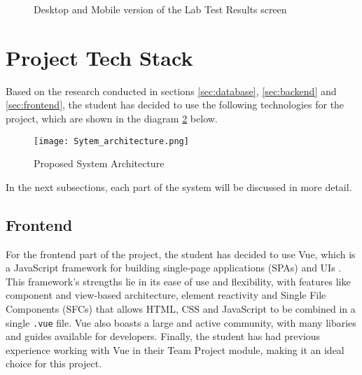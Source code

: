 \begin{figure}[ht]
    \centering
    \begin{minipage}[c]{0.70\textwidth}
    \end{minipage}
    \hspace{0.05\textwidth}
    \begin{minipage}[c]{0.20\textwidth}
    \end{minipage}
    \caption{Desktop and Mobile version of the Lab Test Results screen}
    \label{fig:lab}
\end{figure}

\section{Project Tech Stack}

Based on the research conducted in sections \ref{sec:database}, \ref{sec:backend} and \ref{sec:frontend}, the student has decided to use the following technologies for the project, which are shown in the diagram \ref{fig:architecture} below.

\begin{figure}[htbp]
    \centering
    \texttt{[image: Sytem\_architecture.png]}
    \caption{Proposed System Architecture}
    \label{fig:architecture}
\end{figure}

In the next subsections, each part of the system will be discussed in more detail.

\subsection{Frontend}

For the frontend part of the project, the student has decided to use Vue, which is a JavaScript framework for building single-page applications (SPAs) and UIs \parencite{vue}. This framework's strengths lie in its ease of use and flexibility, with features like component and view-based architecture, element reactivity and Single File Components (SFCs) that allows HTML, CSS and JavaScript to be combined in a single \lstinline{.vue} file. Vue also boasts a large and active community, with many libaries and guides available for developers. Finally, the student has had previous experience working with Vue in their Team Project module, making it an ideal choice for this project.

